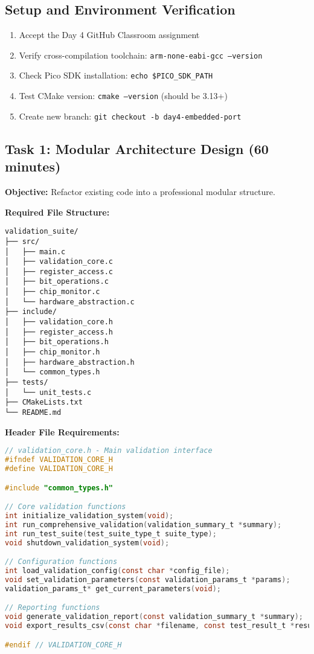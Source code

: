 \documentclass[11pt,a4paper]{article}
\begin{document}
\subsection{Setup and Environment Verification}
\begin{enumerate}
    \item Accept the Day 4 GitHub Classroom assignment
    \item Verify cross-compilation toolchain: \texttt{arm-none-eabi-gcc --version}
    \item Check Pico SDK installation: \texttt{echo \$PICO\_SDK\_PATH}
    \item Test CMake version: \texttt{cmake --version} (should be 3.13+)
    \item Create new branch: \texttt{git checkout -b day4-embedded-port}
\end{enumerate}

\subsection{Task 1: Modular Architecture Design (60 minutes)}

\textbf{Objective:} Refactor existing code into a professional modular structure.

\textbf{Required File Structure:}
\begin{verbatim}
validation_suite/
├── src/
│   ├── main.c
│   ├── validation_core.c
│   ├── register_access.c
│   ├── bit_operations.c
│   ├── chip_monitor.c
│   └── hardware_abstraction.c
├── include/
│   ├── validation_core.h
│   ├── register_access.h
│   ├── bit_operations.h
│   ├── chip_monitor.h
│   ├── hardware_abstraction.h
│   └── common_types.h
├── tests/
│   └── unit_tests.c
├── CMakeLists.txt
└── README.md
\end{verbatim}

\textbf{Header File Requirements:}
\begin{lstlisting}[language=C]
// validation_core.h - Main validation interface
#ifndef VALIDATION_CORE_H
#define VALIDATION_CORE_H

#include "common_types.h"

// Core validation functions
int initialize_validation_system(void);
int run_comprehensive_validation(validation_summary_t *summary);
int run_test_suite(test_suite_type_t suite_type);
void shutdown_validation_system(void);

// Configuration functions
int load_validation_config(const char *config_file);
void set_validation_parameters(const validation_params_t *params);
validation_params_t* get_current_parameters(void);

// Reporting functions
void generate_validation_report(const validation_summary_t *summary);
void export_results_csv(const char *filename, const test_result_t *results, int count);

#endif // VALIDATION_CORE_H
\end{lstlisting}
\end{document}
